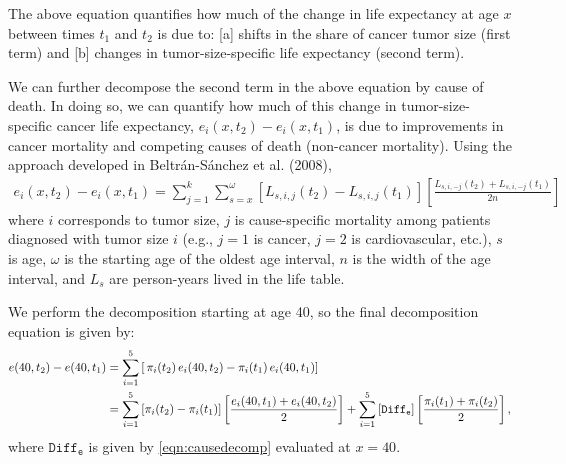 \documentclass[12pt,letterpaper]{article}
\theoremstyle{plain}
\begin{document}
The above equation quantifies how much of the change in life
expectancy at age $x$ between times $t_1$ and $t_2$ is due to: [a]
shifts in the share of cancer tumor size (first term) and [b] changes
in tumor-size-specific life expectancy (second term).

We can further decompose the second term in the above equation by
cause of death. In doing so, we can quantify how much of this change
in tumor-size-specific cancer life expectancy, $e_i(x,t_2)-e_i(x,t_1)$, is due to
improvements in cancer mortality and competing causes of death (non-cancer mortality).  Using the
approach developed in Beltr\'{a}n-S\'{a}nchez et al. (2008),
\begin{eqnarray}
e_i(x,t_2)-e_i(x,t_1)=\sum_{j=1}^{k} \sum_{s=x}^{\omega}\left[L_{s,i,j}(t_2)-L_{s,i,j}(t_1) \right] \left[\frac{L_{s,i,-j}(t_2)+L_{s,i,-j}(t_1) }{2n} \right]
\label{eqn:causedecomp}
\end{eqnarray}
where $i$ corresponds to tumor size, $j$ is cause-specific mortality
among patients diagnosed with tumor size $i$ (e.g., $j=1$ is cancer, $j=2$ is cardiovascular, etc.), $s$ is age, $\omega$ is
the starting age of the oldest age interval, $n$ is the width of the age
interval, and $L_s$ are person-years lived in the life table.

We perform the decomposition starting at age 40, so the final
decomposition equation is given by:
\begin{align*}
  e(40,t_2)-e(40,t_1)&=\sum_{i=1}^{5}\left[\,\pi_i(t_2)\,e_i(40,t_2)- \pi_i(t_1)\,e_i(40,t_1)\right] \notag \\
  &=\sum_{i=1}^{5}\left[\pi_i(t_2)-\pi_i(t_1) \right]\left[\frac{e_i(40,t_1)+e_i(40,t_2)}{2}\right]+\sum_{i=1}^{5}\left[\mathtt{Diff_e} \right]\left[\frac{\pi_i(t_1)+\pi_i(t_2)}{2}\right],
\end{align*}
where $\mathtt{Diff_e}$ is given by \eqref{eqn:causedecomp} evaluated at $x=40$.\\
\end{document}
